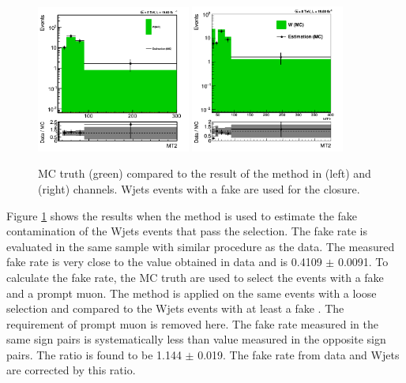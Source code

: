\begin{figure}[!Hhtb]
\centering
\includegraphics[width=0.45\textwidth,keepaspectratio=true]{FakeRateMuTau/Estimation_pfWJets_ExtraLepExcl_SameSignWeightedHiggs.png}
\includegraphics[width=0.45\textwidth,keepaspectratio=true]{FakeRateEleTau/Closure.png}
\caption{MC truth (green) compared to the result of the method in \muTau (left) and \eTau (right) channels. Wjets events with a fake \Tau are used for the closure.}
\label{fig:LepTauClusure}
\end{figure}
Figure \ref{fig:LepTauClusure} shows the results when the method is used to estimate the fake contamination of the Wjets events that pass the selection. 
The fake rate is evaluated in the same sample with similar procedure as the data. The measured fake rate is very close to
the value obtained in data and is 0.4109 $\pm$  0.0091. 
To calculate the fake rate, the MC truth are used to select the events with a fake \Tau 
and a prompt muon. The method is applied on the same events with a loose \Tau selection and compared to the Wjets events with at least 
a fake \Tau. The requirement of prompt muon is removed here.
The fake rate measured in the same sign pairs is systematically less than value 
measured in the opposite sign pairs. The ratio is found to be 1.144 $\pm$ 0.019. The fake rate from data and Wjets are corrected by this ratio.

